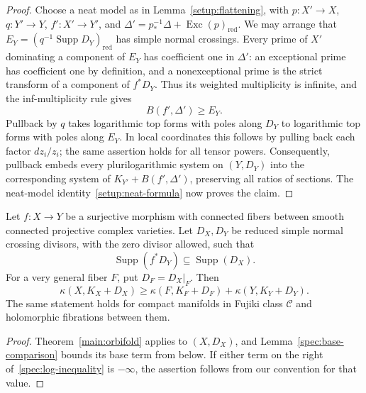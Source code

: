 \begin{proof}
Choose a neat model as in Lemma~\ref{setup:flattening}, with
$p:X'\to X$, $q:Y'\to Y$, $f':X'\to Y'$, and
$\Delta'=p_*^{-1}\Delta+\operatorname{Exc}(p)_{\mathrm{red}}$.
We may arrange that
$E_Y=(q^{-1}\operatorname{Supp}D_Y)_{\mathrm{red}}$ has simple
normal crossings.  Every prime of $X'$ dominating a component of
$E_Y$ has coefficient one in $\Delta'$: an exceptional prime has
coefficient one by definition, and a nonexceptional prime is the strict
transform of a component of $f^*D_Y$.  Thus its weighted multiplicity
is infinite, and the inf-multiplicity rule gives
\[
 B(f',\Delta')\geq E_Y.
\]
Pullback by $q$ takes logarithmic top forms with poles along $D_Y$
to logarithmic top forms with poles along $E_Y$.  In local coordinates
this follows by pulling back each factor $dz_i/z_i$; the same assertion
holds for all tensor powers.  Consequently, pullback embeds every
plurilogarithmic system on $(Y,D_Y)$ into the corresponding system of
$K_{Y'}+B(f',\Delta')$, preserving all ratios of sections.
The neat-model identity~\eqref{setup:neat-formula} now proves the
claim.
\end{proof}

\begin{corollary}
\label{spec:logarithmic}
Let $f:X\to Y$ be a surjective morphism with connected fibers between
smooth connected projective complex varieties.  Let $D_X,D_Y$ be
reduced simple normal crossing divisors, with the zero divisor allowed,
such that
\[
 \operatorname{Supp}(f^*D_Y)\subseteq\operatorname{Supp}(D_X).
\]
For a very general fiber $F$, put $D_F=D_X|_F$.  Then
\begin{equation}\label{spec:log-inequality}
 \kappa(X,K_X+D_X)
 \geq\kappa(F,K_F+D_F)+\kappa(Y,K_Y+D_Y).
\end{equation}
The same statement holds for compact manifolds in Fujiki class
$\mathcal C$ and holomorphic fibrations between them.
\end{corollary}

\begin{proof}
Theorem~\ref{main:orbifold} applies to $(X,D_X)$, and
Lemma~\ref{spec:base-comparison} bounds its base term from below.
If either term on the right of~\eqref{spec:log-inequality} is
$-\infty$, the assertion follows from our convention for that value.
\end{proof}

